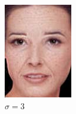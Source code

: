 \begin{figure}[t]
\begin{subfigure}[t]{0.2\textwidth}
		\includegraphics[width=\textwidth]{gandhi/sim3.png}
		\caption{$\sigma = 3$ }
	\end{subfigure}
	\begin{subfigure}[t]{0.2\textwidth}

\end{subfigure}
\end{figure}
